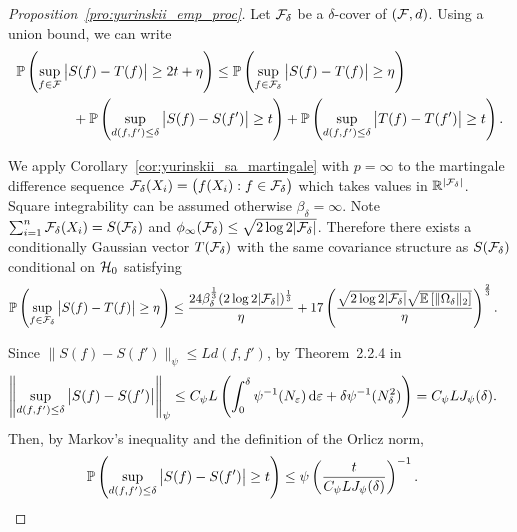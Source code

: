 \begin{proof}[Proposition~\ref{pro:yurinskii_emp_proc}]

  Let $\cF_\delta$ be a $\delta$-cover of $(\cF, d)$.
  Using a union bound, we can write
  \begin{align*}
    &\P\left(\sup_{f \in \cF}
      \big| S(f) - T(f) \big|
    \geq 2t + \eta \right)
    \leq
    \P\left(\sup_{f \in \cF_\delta}
      \big| S(f) - T(f) \big|
    \geq \eta \right) \\
    &\qquad\qquad+
    \P\left(\sup_{d(f,f') \leq \delta}
      \big| S(f) - S(f') \big|
    \geq t \right)
    + \P\left(\sup_{d(f,f') \leq \delta}
      \big| T(f) - T(f') \big|
    \geq t \right).
  \end{align*}


  We apply Corollary~\ref{cor:yurinskii_sa_martingale}
  with $p = \infty$ to the
  martingale difference sequence
  $\cF_\delta(X_i) = \big(f(X_i) : f \in \cF_\delta\big)$
  which takes values in $\R^{|\cF_\delta|}$.
  Square integrability can be assumed otherwise
  $\beta_\delta = \infty$.
  Note $\sum_{i=1}^n \cF_\delta(X_i) = S(\cF_\delta)$
  and $\phi_\infty(\cF_\delta) \leq \sqrt{2 \log 2 |\cF_\delta|}$.
  Therefore there exists a conditionally Gaussian vector $T(\cF_\delta)$
  with the same covariance structure as $S(\cF_\delta)$
  conditional on $\cH_0$ satisfying
  \begin{align*}
    \P\left(
      \sup_{f \in \cF_\delta}
      \big| S(f) - T(f) \big|
      \geq \eta
    \right)
    &\leq
    \frac{24\beta_\delta^{\frac{1}{3}}
    (2\log 2 |\cF_\delta|)^{\frac{1}{3}}}{\eta}
    + 17\left(\frac{\sqrt{2 \log 2 |\cF_\delta|}
    \sqrt{\E\left[\|\Omega_\delta\|_2\right]}}{\eta }\right)^{\frac{2}{3}}.
  \end{align*}


  Since $\big\| S(f) - S(f') \big\|_\psi \leq L d(f,f')$,
  by Theorem~2.2.4 in \citet{van1996weak}
  \begin{align*}
    \left\|
    \sup_{d(f,f') \leq \delta}
    \big| S(f) - S(f') \big|
    \right\|_\psi
    &\leq
    C_\psi L
    \left(
      \int_0^\delta
      \psi^{-1}(N_\varepsilon) \diff{\varepsilon}
      + \delta \psi^{-1}(N_\delta^2)
    \right)
    = C_\psi L J_\psi(\delta).
  \end{align*}
  Then, by Markov's inequality and the definition of the Orlicz norm,
  \begin{align*}
    \P\left(
      \sup_{d(f,f') \leq \delta}
      \big| S(f) - S(f') \big|
      \geq t
    \right)
    &\leq
    \psi\left(\frac{t}{C_\psi L J_\psi(\delta)} \right)^{-1}.
  \end{align*}


\end{proof}
